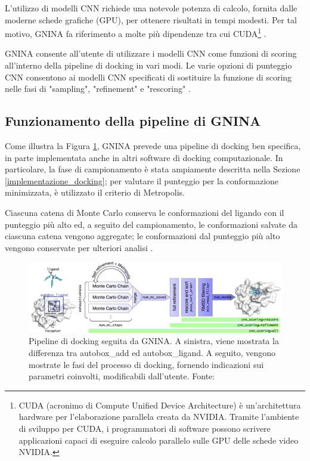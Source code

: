 L'utilizzo di modelli CNN richiede una notevole potenza di calcolo, fornita dalle moderne schede grafiche (GPU), per ottenere risultati in tempi modesti. Per tal motivo, GNINA fa riferimento a molte più dipendenze tra cui CUDA\footnote{CUDA (acronimo di Compute Unified Device Architecture) è un'architettura hardware per l'elaborazione parallela creata da NVIDIA. Tramite l'ambiente di sviluppo per CUDA, i programmatori di software possono scrivere applicazioni capaci di eseguire calcolo parallelo sulle GPU delle schede video NVIDIA.} \cite{mcnutt_gnina_2021}.

GNINA consente all'utente di utilizzare i modelli CNN come funzioni di scoring all'interno della pipeline di docking in vari modi. Le varie opzioni di punteggio CNN consentono ai modelli CNN specificati di sostituire la funzione di scoring nelle fasi di "sampling", "refinement" e "rescoring" \cite{mcnutt_gnina_2021}. 


\subsection{Funzionamento della pipeline di GNINA}
Come illustra la Figura \ref{fig:gnina_pipeline}, GNINA prevede una pipeline di docking ben specifica, in parte implementata anche in altri software di docking computazionale. In particolare, la fase di campionamento è stata ampiamente descritta nella Sezione \ref{implementazione_docking};  per valutare il punteggio per la conformazione minimizzata, è utilizzato il criterio di Metropolis.

Ciascuna catena di Monte Carlo conserva le conformazioni del ligando con il punteggio più alto ed, a seguito del campionamento, le conformazioni salvate da ciascuna catena vengono aggregate; le conformazioni dal punteggio più alto vengono conservate per ulteriori analisi \cite{mcnutt_gnina_2021}. 

\vspace{0.5cm}
\begin{figure}[H]
    \centering
    \includegraphics[scale=0.35]{images/gnina_pipeline.jpg}
    \caption[Pipeline di docking seguita da GNINA.]{Pipeline di docking seguita da GNINA. A sinistra, viene mostrata la differenza tra autobox_add ed autobox_ligand. A seguito, vengono mostrate le fasi del processo di docking, fornendo indicazioni sui parametri coinvolti, modificabili dall'utente. Fonte: \cite{mcnutt_gnina_2021}}
    \label{fig:gnina_pipeline}
\end{figure}

